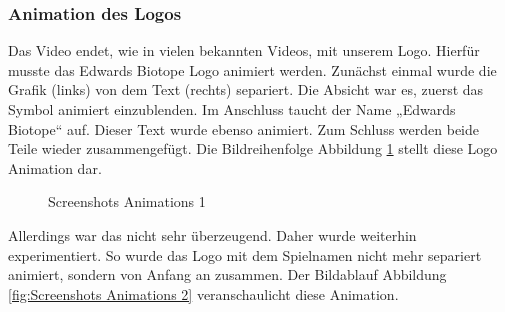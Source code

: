 \subsubsection{Animation des Logos}
Das Video endet, wie in vielen bekannten Videos, mit unserem Logo. Hierfür musste das Edwards Biotope Logo animiert werden. 
Zunächst einmal wurde die Grafik (links) von dem Text (rechts) separiert. Die Absicht war es, zuerst das Symbol animiert einzublenden. Im Anschluss taucht der Name „Edwards Biotope“ auf. Dieser Text wurde ebenso animiert. Zum Schluss werden beide Teile wieder zusammengefügt. Die Bildreihenfolge Abbildung \ref{fig:Screenshots Animations 1} stellt diese Logo Animation dar. 
\begin{figure}[h]
\centering
\qquad
\qquad
\qquad
\caption{Screenshots Animations 1}%
 \label{fig:Screenshots Animations 1}%
\end{figure}
Allerdings war das nicht sehr überzeugend. Daher wurde weiterhin experimentiert. So wurde das Logo mit dem Spielnamen nicht mehr separiert animiert, sondern von Anfang an zusammen. Der Bildablauf  Abbildung \ref{fig:Screenshots Animations 2} veranschaulicht diese Animation.

